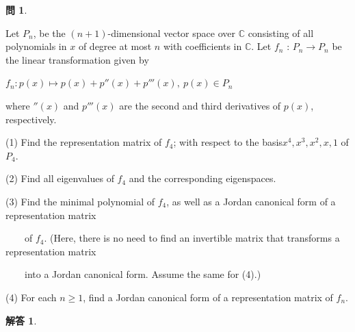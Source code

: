 \documentclass{jsarticle}
\newtheorem*{question*}{問}
\newtheorem*{answer*}{解答}
\begin{document}
\begin{question*}
\end{question*}

    Let $P_n$, be the $(n + 1)$-dimensional vector space over $\mathbb{C}$ consisting of all polynomials in $x$ of degree at most $n$ with coefficients in $\mathbb{C}$. Let $f_n$ : $P_n \to P_n$ be the linear transformation given by 

\vspace{10pt}
\begin{center}
$f_n : p(x) \mapsto p(x) + p''(x) + p'''(x), \ p(x) \in P_n$
\end{center}
\vspace{10pt}

    where $''(x)$ and $p'''(x)$ are the second and third derivatives of $p(x)$, respectively. 

\vspace{10pt}

    (1) Find the representation matrix of $f_4$; with respect to the basis$x^4, x^3, x^2, x, 1$ of $P_4$.   

\vspace{10pt}


    (2) Find all eigenvalues of $f_4$ and the corresponding eigenspaces. 

\vspace{10pt}

    (3) Find the minimal polynomial of $f_4$, as well as a Jordan canonical form of a representation matrix

\vspace{10pt}

    \ \ \ \ of $f_4$. (Here, there is no need to find an invertible 
    matrix that transforms a representation matrix 

\vspace{10pt}

   \ \ \ \ into a Jordan canonical form. Assume the same for (4).) 

\vspace{10pt}

    (4) For each $n \ge 1$, find a Jordan canonical form of a representation matrix of $f_n$. 

\vspace{10pt}

\par

\begin{answer*}
\end{answer*}
\end{document}
